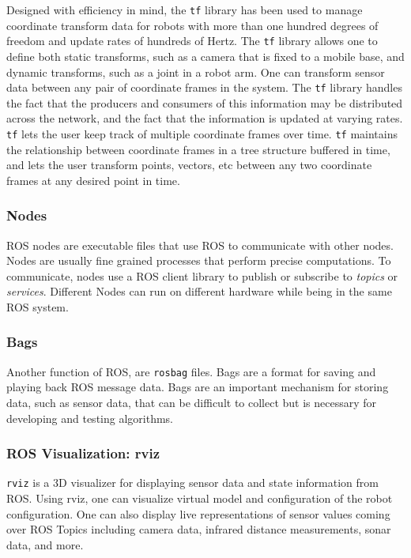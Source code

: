Designed with efficiency in mind, the \texttt{tf} library has been used to manage coordinate transform data for robots with more than one hundred degrees of freedom and update rates of hundreds of Hertz. The \texttt{tf} library allows one to define both static transforms, such as a camera that is fixed to a mobile base, and dynamic transforms, such as a joint in a robot arm. One can transform sensor data between any pair of coordinate frames in the system. The \texttt{tf} library handles the fact that the producers and consumers of this information may be distributed across the network, and the fact that the information is updated at varying rates.\\
\texttt{tf} lets the user keep track of multiple coordinate frames over time. \texttt{tf} maintains the relationship between coordinate frames in a tree structure buffered in time, and lets the user transform points, vectors, etc between any two coordinate frames at any desired point in time.

\subsubsection*{Nodes}
\ac{ROS} nodes are executable files that use \ac{ROS} to communicate with other nodes. Nodes are usually fine grained processes that perform precise computations. To communicate, nodes use a ROS client library to publish or subscribe to \emph{topics} or \emph{services}. Different Nodes can run on different hardware while being in the same \ac{ROS} system.

\subsubsection*{Bags}
Another function of \ac{ROS}, are \lstinline|rosbag| files. Bags are a format for saving and playing back \ac{ROS} message data. Bags are an important mechanism for storing data, such as sensor data, that can be difficult to collect but is necessary for developing and testing algorithms.

\subsubsection*{ROS Visualization: rviz}
\texttt{rviz} is a 3D visualizer for displaying sensor data and state information from ROS. Using rviz, one can visualize virtual model and configuration of the robot configuration. One can also display live representations of sensor values coming over ROS Topics including camera data, infrared distance measurements, sonar data, and more.

